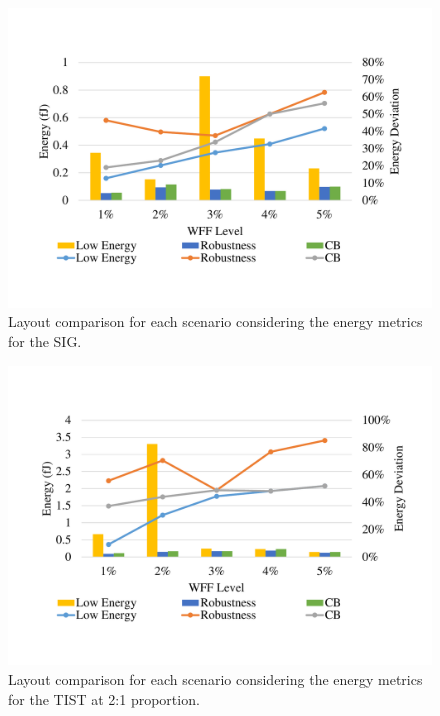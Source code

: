 \documentclass[pgmicro,mestrado,english]{iiufrgs}
\begin{document}
    \begin{figure}[]
        \centering
            \includegraphics[width=1\textwidth, trim={1.25cm 3cm 2cm 3cm}, clip]{comp3Lsig2Energy.pdf}
            \caption{Layout comparison for each scenario considering the energy metrics for the SIG.}
        \label{figscCompSIG}
    \end{figure}

    \begin{figure}[]
        \centering
            \includegraphics[width=1\textwidth, trim={1.25cm 3cm 2cm 3cm}, clip]{comp3Ltist212Energy.pdf}
            \caption{Layout comparison for each scenario considering the energy metrics for the TIST at 2:1 proportion.}
        \label{figscCompTIST21}
    \end{figure}
\end{document}

